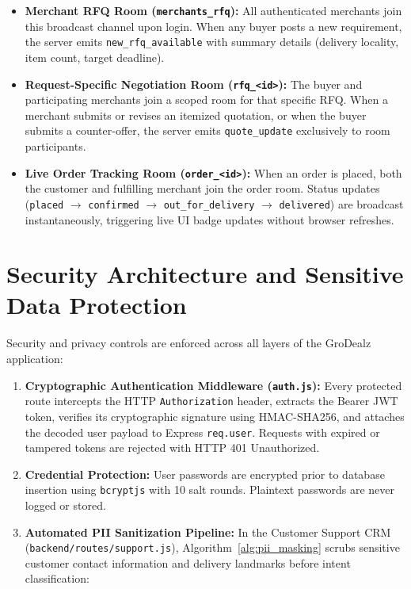 \begin{itemize}
    \item \textbf{Merchant RFQ Room (\texttt{merchants\_rfq}):} All authenticated merchants join this broadcast channel upon login. When any buyer posts a new requirement, the server emits \texttt{new\_rfq\_available} with summary details (delivery locality, item count, target deadline).
    \item \textbf{Request-Specific Negotiation Room (\texttt{rfq\_<id>}):} The buyer and participating merchants join a scoped room for that specific RFQ. When a merchant submits or revises an itemized quotation, or when the buyer submits a counter-offer, the server emits \texttt{quote\_update} exclusively to room participants.
    \item \textbf{Live Order Tracking Room (\texttt{order\_<id>}):} When an order is placed, both the customer and fulfilling merchant join the order room. Status updates (\texttt{placed} $\to$ \texttt{confirmed} $\to$ \texttt{out\_for\_delivery} $\to$ \texttt{delivered}) are broadcast instantaneously, triggering live UI badge updates without browser refreshes.
\end{itemize}

\section{Security Architecture and Sensitive Data Protection}

Security and privacy controls are enforced across all layers of the GroDealz application:

\begin{enumerate}
    \item \textbf{Cryptographic Authentication Middleware (\texttt{auth.js}):} Every protected route intercepts the HTTP \texttt{Authorization} header, extracts the Bearer JWT token, verifies its cryptographic signature using HMAC-SHA256, and attaches the decoded user payload to Express \texttt{req.user}. Requests with expired or tampered tokens are rejected with HTTP 401 Unauthorized.
    \item \textbf{Credential Protection:} User passwords are encrypted prior to database insertion using \texttt{bcryptjs} with 10 salt rounds. Plaintext passwords are never logged or stored.
    \item \textbf{Automated PII Sanitization Pipeline:} In the Customer Support CRM (\texttt{backend/routes/support.js}), Algorithm~\ref{alg:pii_masking} scrubs sensitive customer contact information and delivery landmarks before intent classification:
\end{enumerate}

